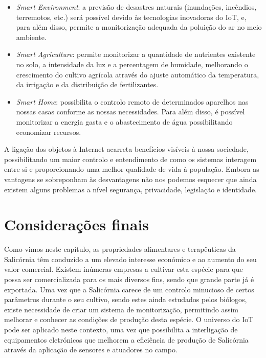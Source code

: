 \begin{itemize}
	\item \textit{Smart Environment}: a previsão de desastres naturais (inundações, incêndios, terremotos, etc.) será possível devido às tecnologias inovadoras do IoT, e, para além disso, permite a monitorização adequada da poluição do ar no meio ambiente\cite{Farooq2015}.
		
	\item \textit{Smart Agriculture}: permite monitorizar a quantidade de nutrientes existente no solo, a intensidade da luz e a percentagem de humidade, melhorando o crescimento do cultivo agrícola através do ajuste automático da temperatura, da irrigação e da distribuição de fertilizantes\cite{-2013}.
	
	\item \textit{Smart Home}: possibilita o controlo remoto de determinados aparelhos nas nossas casas conforme as nossas necessidades. Para além disso, é possível monitorizar a energia gasta e o abastecimento de água possibilitando economizar recursos\cite{Farooq2015}. 
	 
\end{itemize}


A ligação dos objetos à Internet acarreta benefícios visíveis à nossa sociedade, possibilitando um maior controlo e entendimento de como os sistemas interagem entre si e proporcionando uma melhor qualidade de vida à população. Embora as vantagens se sobreponham às desvantagens não nos podemos esquecer que ainda existem alguns problemas a nível segurança, privacidade, legislação e identidade.


\section{Considerações finais}


Como vimos neste capítulo, as propriedades alimentares e terapêuticas da Salicórnia têm conduzido a um elevado interesse económico e ao aumento do seu valor comercial. Existem inúmeras empresas a cultivar esta espécie para que possa ser comercializada para os mais diversos fins, sendo que grande parte já é exportada. Uma vez que a Salicórnia carece de um controlo minucioso de certos parâmetros durante o seu cultivo, sendo estes ainda estudados pelos biólogos, existe necessidade de criar um sistema de monitorização, permitindo assim melhorar e conhecer as condições de produção desta espécie. O universo do \ac{IoT} pode ser aplicado neste contexto, uma vez que possibilita a interligação de equipamentos eletrónicos que melhorem a eficiência de produção de Salicórnia através da aplicação de sensores e atuadores no campo.  





